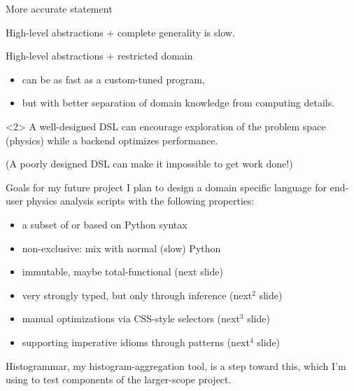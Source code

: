 \documentclass{beamer}
\begin{document}
\begin{frame}{More accurate statement}

\vfill
High-level abstractions $+$ complete generality is slow.

\vfill
High-level abstractions $+$ restricted domain
\begin{itemize}
\item can be as fast as a custom-tuned program,
\item but with better separation of domain knowledge from computing details.
\end{itemize}

\vfill
\begin{uncoverenv}<2>
A well-designed DSL can encourage exploration of the problem space (physics) while a backend optimizes performance.

\vspace{0.25 cm}
(A poorly designed DSL can make it impossible to get work done!)
\end{uncoverenv}
\end{frame}

\begin{frame}{Goals for my future project}
\vfill
I plan to design a domain specific language for end-user physics analysis scripts with the following properties:

\vspace{0.2 cm}
\begin{itemize}
\item a subset of or based on Python syntax
\item non-exclusive: mix with normal (slow) Python
\item immutable, maybe total-functional (next slide)
\item very strongly typed, but only through inference (next$^2$ slide)
\item manual optimizations via CSS-style selectors (next$^3$ slide)
\item supporting imperative idioms through patterns (next$^4$ slide)
\end{itemize}

\vfill
Histogrammar, my histogram-aggregation tool, is a step toward this, which I'm using to test components of the larger-scope project.
\end{frame}
\end{document}
